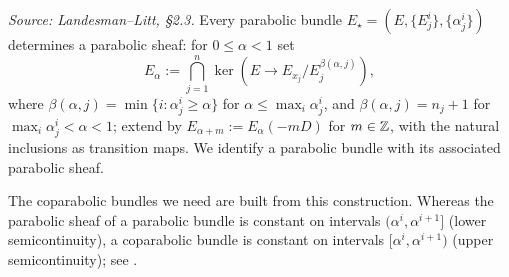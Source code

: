\begin{definition}
  \label{def:parabolic-bundle-sheaf}
  \textit{Source: Landesman--Litt, \S2.3.}
  Every parabolic bundle $E_\star = (E, \{E^i_j\}, \{\alpha^i_j\})$ determines a
  parabolic sheaf: for $0 \leq \alpha < 1$ set
  \[
    E_\alpha := \bigcap_{j=1}^n \ker\!\left(E \to E_{x_j}/E^{\beta(\alpha,j)}_j\right),
  \]
  where $\beta(\alpha,j) = \min\{ i : \alpha^i_j \geq \alpha\}$ for
  $\alpha \leq \max_i \alpha^i_j$, and $\beta(\alpha,j) = n_j+1$ for
  $\max_i \alpha^i_j < \alpha < 1$; extend by $E_{\alpha+m} := E_\alpha(-mD)$ for
  $m \in \mathbb{Z}$, with the natural inclusions as transition maps. We identify a
  parabolic bundle with its associated parabolic sheaf.
\end{definition}

The coparabolic bundles we need are built from this construction. Whereas the
parabolic sheaf of a parabolic bundle is constant on intervals
$(\alpha^i, \alpha^{i+1}]$ (lower semicontinuity), a coparabolic bundle is
constant on intervals $[\alpha^i, \alpha^{i+1})$ (upper semicontinuity); see
\cite[Figure 1]{bodenY:moduli-spaces-of-parabolic-higgs-bundles}.

